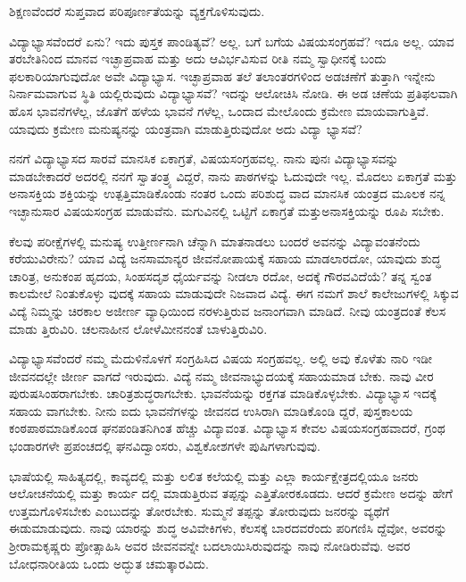 ಶಿಕ್ಷಣವೆಂದರೆ ಸುಪ್ತವಾದ ಪರಿಪೂರ್ಣತೆಯನ್ನು ವ್ಯಕ್ತಗೊಳಿಸುವುದು. 

ವಿದ್ಯಾಭ್ಯಾಸವೆಂದರೆ ಏನು? ಇದು ಪುಸ್ತಕ ಪಾಂಡಿತ್ಯವೆ? ಅಲ್ಲ. ಬಗೆ ಬಗೆಯ ವಿಷಯಸಂಗ್ರಹವೆ? ಇದೂ ಅಲ್ಲ. ಯಾವ ತರಬೇತಿನಿಂದ ಮಾನವ ಇಚ್ಛಾಪ್ರವಾಹ ಮತ್ತು ಅದು ಆವಿರ್ಭವಿಸುವ ರೀತಿ ನಮ್ಮ ಸ್ವಾಧೀನಕ್ಕೆ ಬಂದು ಫಲಕಾರಿಯಾಗುವುದೋ ಅವೇ ವಿದ್ಯಾಭ್ಯಾಸ. ಇಚ್ಛಾಪ್ರವಾಹ ತಲೆ ತಲಾಂತರಗಳಿಂದ ಅಡಚಣೆಗೆ ತುತ್ತಾಗಿ ಇನ್ನೇನು ನಿರ್ನಾಮವಾಗುವ ಸ್ಥಿತಿ ಯಲ್ಲಿರುವುದು ವಿದ್ಯಾಭ್ಯಾಸವೆ? ಇದನ್ನು ಆಲೋಚಿಸಿ ನೋಡಿ. ಈ ಅಡ ಚಣೆಯ ಪ್ರತಿಫಲವಾಗಿ ಹೊಸ ಭಾವನೆಗಳೆಲ್ಲ, ಜೊತೆಗೆ ಹಳೆಯ ಭಾವನೆ ಗಳೆಲ್ಲ, ಒಂದಾದ ಮೇಲೊಂದು ಕ್ರಮೇಣ ಮಾಯವಾಗುತ್ತಿವೆ. ಯಾವುದು ಕ್ರಮೇಣ ಮನುಷ್ಯನನ್ನು ಯಂತ್ರವಾಗಿ ಮಾಡುತ್ತಿರುವುದೋ ಅದು ವಿದ್ಯಾ ಭ್ಯಾಸವೆ?

ನನಗೆ ವಿದ್ಯಾಭ್ಯಾಸದ ಸಾರವೆ ಮಾನಸಿಕ ಏಕಾಗ್ರತೆ, ವಿಷಯಸಂಗ್ರಹವಲ್ಲ. ನಾನು ಪುನಃ ವಿದ್ಯಾಭ್ಯಾಸವನ್ನು ಮಾಡಬೇಕಾದರೆ ಅದರಲ್ಲಿ ನನಗೆ ಸ್ವಾತಂತ್ರ್ಯ ವಿದ್ದರೆ, ನಾನು ಪಾಠಗಳನ್ನು ಓದುವುದೇ ಇಲ್ಲ. ಮೊದಲು ಏಕಾಗ್ರತೆ ಮತ್ತು ಅನಾಸಕ್ತಿಯ ಶಕ್ತಿಯನ್ನು ಉತ್ಪತ್ತಿಮಾಡಿಕೊಂಡು ನಂತರ ಒಂದು ಪರಿಶುದ್ಧ ವಾದ ಮಾನಸಿಕ ಯಂತ್ರದ ಮೂಲಕ ನನ್ನ ಇಚ್ಛಾನುಸಾರ ವಿಷಯಸಂಗ್ರಹ ಮಾಡುವೆನು. ಮಗುವಿನಲ್ಲಿ ಒಟ್ಟಿಗೆ ಏಕಾಗ್ರತೆ ಮತ್ತುಅನಾಸಕ್ತಿಯನ್ನು ರೂಪಿ ಸಬೇಕು.

ಕೆಲವು ಪರೀಕ್ಷೆಗಳಲ್ಲಿ ಮನುಷ್ಯ ಉತ್ತೀರ್ಣನಾಗಿ ಚೆನ್ನಾಗಿ ಮಾತನಾಡಲು ಬಂದರೆ ಅವನನ್ನು ವಿದ್ಯಾವಂತನೆಂದು ಕರೆಯುವಿರೇನು? ಯಾವ ವಿದ್ಯೆ ಜನಸಾಮಾನ್ಯರ ಜೀವನೋಪಾಯಕ್ಕೆ ಸಹಾಯ ಮಾಡಲಾರದೋ, ಯಾವುದು ಶುದ್ಧ ಚಾರಿತ್ರ, ಅನುಕಂಪ ಹೃದಯ, ಸಿಂಹಸದೃಶ ಧೈರ್ಯವನ್ನು ನೀಡಲಾ ರದೋ, ಅದಕ್ಕೆ ಗೌರವವಿದೆಯೆ? ತನ್ನ ಸ್ವಂತ ಕಾಲಮೇಲೆ ನಿಂತುಕೊಳ್ಳು ವುದಕ್ಕೆ ಸಹಾಯ ಮಾಡುವುದೇ ನಿಜವಾದ ವಿದ್ಯೆ. ಈಗ ನಮಗೆ ಶಾಲೆ ಕಾಲೇಜುಗಳಲ್ಲಿ ಸಿಕ್ಕುವ ವಿದ್ಯೆ ನಿಮ್ಮನ್ನು ಚಿರಕಾಲ ಅಜೀರ್ಣ ವ್ಯಾಧಿಯಿಂದ ನರಳುತ್ತಿರುವ ಜನಾಂಗವಾಗಿ ಮಾಡಿದೆ. ನೀವು ಯಂತ್ರದಂತೆ ಕೆಲಸ ಮಾಡು ತ್ತಿರುವಿರಿ. ಚಲನಾಹೀನ ಲೋಳೆಮೀನನಂತೆ  ಬಾಳುತ್ತಿರುವಿರಿ.

ವಿದ್ಯಾಭ್ಯಾಸವೆಂದರೆ ನಮ್ಮ ಮೆದುಳಿನೊಳಗೆ ಸಂಗ್ರಹಿಸಿದ ವಿಷಯ ಸಂಗ್ರಹವಲ್ಲ. ಅಲ್ಲಿ ಅವು ಕೊಳೆತು ನಾರಿ ಇಡೀ ಜೀವನದಲ್ಲೇ ಜೀರ್ಣ ವಾಗದೆ ಇರುವುದು. ವಿದ್ಯೆ ನಮ್ಮ ಜೀವನಾಭ್ಯುದಯಕ್ಕೆ ಸಹಾಯಮಾಡ ಬೇಕು. ನಾವು ವೀರ ಪುರುಷಸಿಂಹರಾಗಬೇಕು. ಚಾರಿತ್ರಶುದ್ಧರಾಗಬೇಕು. ಭಾವನೆಯನ್ನು ರಕ್ತಗತ ಮಾಡಿಕೊಳ್ಳಬೇಕು. ವಿದ್ಯಾಭ್ಯಾಸ ಇದಕ್ಕೆ ಸಹಾಯ ವಾಗಬೇಕು. ನೀನು ಐದು ಭಾವನೆಗಳನ್ನು ಜೀವನದ ಉಸಿರಾಗಿ ಮಾಡಿಕೊಂಡಿ ದ್ದರೆ, ಪುಸ್ತಕಾಲಯ ಕಂಠಪಾಠಮಾಡಿಕೊಂಡ ಘನಪಂಡಿತನಿಗಿಂತ ಹೆಚ್ಚು ವಿದ್ಯಾವಂತ. ವಿದ್ಯಾಭ್ಯಾಸ ಕೇವಲ ವಿಷಯಸಂಗ್ರಹವಾದರೆ, ಗ್ರಂಥ ಭಂಡಾರಗಳೇ ಪ್ರಪಂಚದಲ್ಲಿ ಘನವಿದ್ವಾಂಸರು, ವಿಶ್ವಕೋಶಗಳೇ  ಪುಷಿಗಳಾಗುವುವು.

ಭಾಷೆಯಲ್ಲಿ ಸಾಹಿತ್ಯದಲ್ಲಿ, ಕಾವ್ಯದಲ್ಲಿ ಮತ್ತು ಲಲಿತ ಕಲೆಯಲ್ಲಿ ಮತ್ತು ಎಲ್ಲಾ ಕಾರ್ಯಕ್ಷೇತ್ರದಲ್ಲಿಯೂ ಜನರು ಆಲೋಚನೆಯಲ್ಲಿ ಮತ್ತು ಕಾರ್ಯ ದಲ್ಲಿ ಮಾಡುತ್ತಿರುವ ತಪ್ಪನ್ನು ಎತ್ತಿತೋರಕೂಡದು. ಆದರೆ ಕ್ರಮೇಣ ಅದನ್ನು ಹೇಗೆ ಉತ್ತಮಗೊಳಿಸಬೇಕು ಎಂಬುದನ್ನು ತೋರಬೇಕು. ಸುಮ್ಮನೆ ತಪ್ಪನ್ನು ತೋರುವುದು ಜನರನ್ನು ವ್ಯಥೆಗೆ ಈಡುಮಾಡುವುದು. ನಾವು ಯಾರನ್ನು ಶುದ್ಧ ಅವಿವೇಕಿಗಳು, ಕೆಲಸಕ್ಕೆ ಬಾರದವರೆಂದು ಪರಿಗಣಿಸಿ ದ್ದೆವೋ, ಅವರನ್ನು ಶ್ರೀರಾಮಕೃಷ್ಣರು ಪ್ರೋತ್ಸಾಹಿಸಿ ಅವರ ಜೀವನವನ್ನೇ ಬದಲಾಯಿಸಿರುವುದನ್ನು ನಾವು ನೋಡಿರುವೆವು. ಅವರ ಬೋಧನಾರೀತಿಯ ಒಂದು ಅದ್ಭುತ ಚಮತ್ಕಾರವಿದು.


